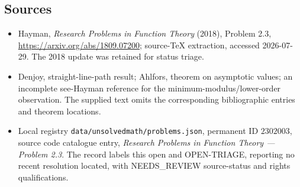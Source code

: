 \documentclass[11pt]{article}
\begin{document}
\subsection{Sources}
\begin{itemize}
\item Hayman, \emph{Research Problems in Function Theory} (2018), Problem 2.3, \url{https://arxiv.org/abs/1809.07200}; source-TeX extraction, accessed 2026-07-29. The 2018 update was retained for status triage.
\item Denjoy, straight-line-path result; Ahlfors, theorem on asymptotic values; an incomplete see-Hayman reference for the minimum-modulus/lower-order observation. The supplied text omits the corresponding bibliographic entries and theorem locations.
\item Local registry \texttt{data/unsolvedmath/problems.json}, permanent ID $2302003$, source code catalogue entry, \emph{Research Problems in Function Theory --- Problem 2.3}. The record labels this open and OPEN-TRIAGE, reporting no recent resolution located, with NEEDS\_REVIEW source-status and rights qualifications.
\end{itemize}
\end{document}

